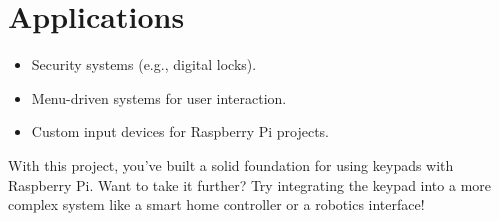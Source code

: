 \documentclass{article}
\begin{document}
	\section*{Applications}
	\begin{itemize}
		\item Security systems (e.g., digital locks).
		\item Menu-driven systems for user interaction.
		\item Custom input devices for Raspberry Pi projects.
	\end{itemize}
	
	With this project, you've built a solid foundation for using keypads with Raspberry Pi. Want to take it further? Try integrating the keypad into a more complex system like a smart home controller or a robotics interface!
	
\end{document}
